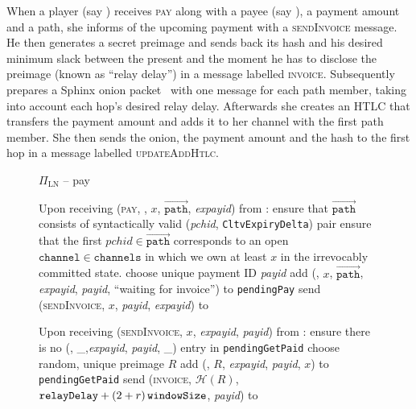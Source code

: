   When a player (say \alice) receives \textsc{pay} along with a payee (say
  \bob), a payment amount and a path, she informs \bob{} of the upcoming payment
  with a \textsc{sendInvoice} message. He then generates a secret preimage and
  sends back its hash and his desired minimum slack between the present and the
  moment he has to disclose the preimage (known as ``relay delay'') in a message
  labelled \textsc{invoice}. Subsequently \alice{} prepares a Sphinx onion
  packet~\cite{sphinx} with one message for each path member, taking into
  account each hop's desired relay delay. Afterwards she creates an HTLC that
  transfers the payment amount and adds it to her channel with the first path
  member. She then sends the onion, the payment amount and the hash to the first
  hop in a message labelled \textsc{updateAddHtlc}.

  \begin{figure}[H]
    \begin{protocolbox}{$\Pi_{\mathrm{LN}}$ -- pay}
      \begin{algorithmic}[1]
        \State Upon receiving (\textsc{pay}, \bob, $x$,
        $\overrightarrow{\mathtt{path}}$, \textit{expayid}) from \environment:
        \Indent
          \State ensure that $\overrightarrow{\mathtt{path}}$ consists of
          syntactically valid (\textit{pchid}, \texttt{CltvExpiryDelta}) pair
          \label{alg:protocol:pay:validpath}
          \State ensure that the first $\mathit{pchid} \in
          \overrightarrow{\mathtt{path}}$ corresponds to an open
          $\mathtt{channel} \in \mathtt{channels}$ in which we own at least $x$
          in the irrevocably committed state.
          \label{alg:protocol:pay:validchannel}
          \State choose unique payment ID \textit{payid} 
          \State add (\bob, $x$, $\overrightarrow{\mathtt{path}}$,
          \textit{expayid}, \textit{payid}, ``waiting for invoice'') to
          \texttt{pendingPay}
          \State send (\textsc{sendInvoice}, $x$, \textit{payid},
          \textit{expayid}) to \bob{}
          \label{alg:protocol:pay:sendinvoice}
        \EndIndent
        \Statex

        \State Upon receiving (\textsc{sendInvoice}, $x$, \textit{expayid},
        \textit{payid}) from \bob:
        \Indent
          \State ensure there is no (\bob, \_,\textit{expayid}, \textit{payid},
          \_) entry in \texttt{pendingGetPaid}
          \State choose random, unique preimage $R$
          \State add (\bob, $R$, \textit{expayid}, \textit{payid}, $x$) to
          \texttt{pendingGetPaid}
          \State send (\textsc{invoice}, $\mathcal{H}(R)$, $\mathtt{relayDelay}
          + \left(2 + r\right)\texttt{windowSize}{}$, \textit{payid}) to \bob{}
        \EndIndent
      \end{algorithmic}
    \end{protocolbox}
    \caption{}
    \label{alg:protocol:pay:outofband}
  \end{figure}

